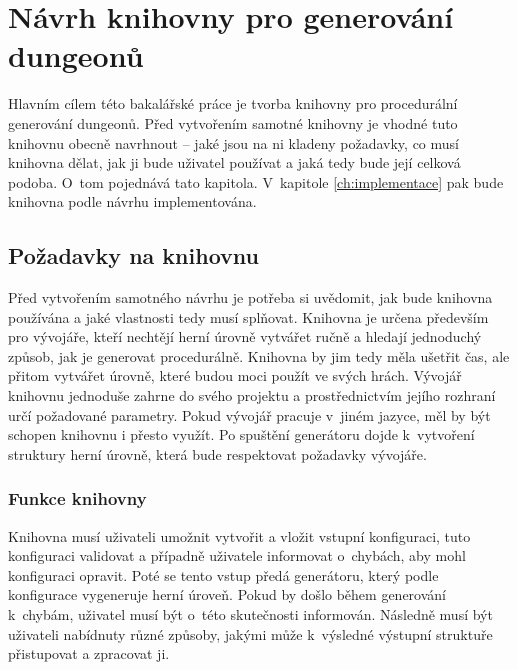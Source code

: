 
\chapter{Návrh knihovny pro generování dungeonů}
\label{ch:navrh} %


Hlavním cílem této bakalářské práce je tvorba knihovny pro procedurální generování dungeonů.
Před vytvořením samotné knihovny je vhodné tuto knihovnu obecně navrhnout -- jaké jsou na ni kladeny požadavky, co musí knihovna dělat, jak ji bude uživatel používat a jaká tedy bude její celková podoba.
O~tom pojednává tato kapitola.
V~kapitole \ref{ch:implementace} pak bude knihovna podle návrhu implementována.


\section{Požadavky na knihovnu}


Před vytvořením samotného návrhu je potřeba si uvědomit, jak bude knihovna používána a jaké vlastnosti tedy musí splňovat.
Knihovna je určena především pro vývojáře, kteří nechtějí herní úrovně vytvářet ručně a hledají jednoduchý způsob, jak je generovat procedurálně.
Knihovna by jim tedy měla ušetřit čas, ale přitom vytvářet úrovně, které budou moci použít ve svých hrách.
Vývojář knihovnu jednoduše zahrne do svého projektu a prostřednictvím jejího rozhraní určí požadované parametry.
Pokud vývojář pracuje v~jiném jazyce, měl by být schopen knihovnu i přesto využít.
Po spuštění generátoru dojde k~vytvoření struktury herní úrovně, která bude respektovat požadavky vývojáře.


\subsection{Funkce knihovny}


Knihovna musí uživateli umožnit vytvořit a vložit vstupní konfiguraci, tuto konfiguraci validovat a případně uživatele informovat o~chybách, aby mohl konfiguraci opravit.
Poté se tento vstup předá generátoru, který podle konfigurace vygeneruje herní úroveň.
Pokud by došlo během generování k~chybám, uživatel musí být o~této skutečnosti informován.
Následně musí být uživateli nabídnuty různé způsoby, jakými může k~výsledné výstupní struktuře přistupovat a zpracovat ji.

